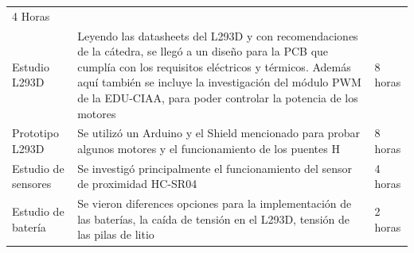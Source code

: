 \begin{longtable}[]{@{}lll@{}}
\begin{minipage}[t]{0.10\columnwidth}
4 Horas\strut
\end{minipage}\tabularnewline
\begin{minipage}[t]{0.17\columnwidth}\raggedright
Estudio L293D\strut
\end{minipage} & \begin{minipage}[t]{0.64\columnwidth}\raggedright
Leyendo las datasheets del L293D y con recomendaciones de la cátedra, se
llegó a un diseño para la PCB que cumplía con los requisitos eléctricos
y térmicos. Además aquí también se incluye la investigación del módulo
PWM de la EDU-CIAA, para poder controlar la potencia de los
motores\strut
\end{minipage} & \begin{minipage}[t]{0.10\columnwidth}\raggedright
8 horas\strut
\end{minipage}\tabularnewline
\begin{minipage}[t]{0.17\columnwidth}\raggedright
Prototipo L293D\strut
\end{minipage} & \begin{minipage}[t]{0.64\columnwidth}\raggedright
Se utilizó un Arduino y el Shield mencionado para probar algunos motores
y el funcionamiento de los puentes H\strut
\end{minipage} & \begin{minipage}[t]{0.10\columnwidth}\raggedright
8 horas\strut
\end{minipage}\tabularnewline
\begin{minipage}[t]{0.17\columnwidth}\raggedright
Estudio de sensores\strut
\end{minipage} & \begin{minipage}[t]{0.64\columnwidth}\raggedright
Se investigó principalmente el funcionamiento del sensor de proximidad
HC-SR04\strut
\end{minipage} & \begin{minipage}[t]{0.10\columnwidth}\raggedright
4 horas\strut
\end{minipage}\tabularnewline
\begin{minipage}[t]{0.17\columnwidth}\raggedright
Estudio de batería\strut
\end{minipage} & \begin{minipage}[t]{0.64\columnwidth}\raggedright
Se vieron diferences opciones para la implementación de las baterías, la
caída de tensión en el L293D, tensión de las pilas de litio\strut
\end{minipage} & \begin{minipage}[t]{0.10\columnwidth}\raggedright
2 horas\strut

\end{minipage}
\end{longtable}
